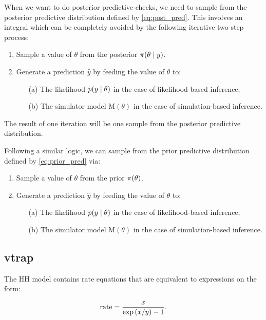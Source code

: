 When we want to do posterior predictive checks, we need to sample from the posterior predictive distribution defined by \autoref{eq:post_pred}. This involves an integral which can be completely avoided by the following iterative two-step process:
\begin{enumerate}
    \item Sample a value of $\theta$ from the posterior $\pi \qty(\theta \mid y)$. 
    \item Generate a prediction $\hat{y}$ by feeding the value of $\theta$ to:
    \begin{itemize}
        \item[(a)] The likelihood $p \qty(y \mid \theta)$ in the case of likelihood-based inference;
        \item[(b)] The simulator model $\mathrm{M}(\theta)$ in the case of simulation-based inference. 
    \end{itemize}
\end{enumerate}

The result of one iteration will be one sample from the posterior predictive distribution. 

Following a similar logic, we can sample from the prior predictive distribution defined by \autoref{eq:prior_pred} via: 
\begin{enumerate}
    \item Sample a value of $\theta$ from the prior $\pi \qty(\theta)$. 
    \item Generate a prediction $\hat{y}$ by feeding the value of $\theta$ to:
    \begin{itemize}
        \item[(a)] The likelihood $p \qty(y \mid \theta)$ in the case of likelihood-based inference;
        \item[(b)] The simulator model $\mathrm{M}(\theta)$ in the case of simulation-based inference. 
    \end{itemize}
\end{enumerate}

\subsection{vtrap} 

The HH model contains rate equations that are equivalent to expressions on the form:

\begin{equation*}
    \mathrm{rate} = \frac{x}{\exp \qty(x/y) - 1}.
\end{equation*}

